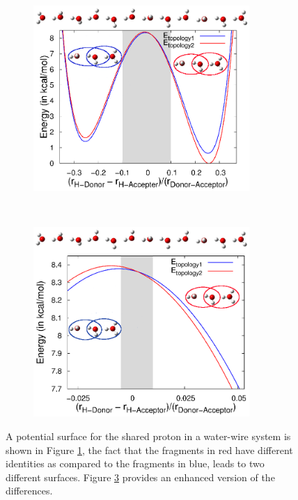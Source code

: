 \begin{figure}[t!]
    \centering
    \begin{subfigure}[t]{0.5\textwidth}
        \centering
        \includegraphics[width=0.9\textwidth]{figures/graph1all.eps}
        \caption{\label{chap1fig2}}
    \end{subfigure}%
    ~
    \begin{subfigure}[t]{0.5\textwidth}
        \centering
        \includegraphics[width=0.9\textwidth]{figures/reZoomedInWithoutCTM.eps}
        \caption{\label{chap1fig3}}
    \end{subfigure}
    \caption{ A potential surface for the shared proton in a water-wire system is
    shown in Figure \ref{chap1fig2}, the fact that the fragments in red have different
    identities as compared to the fragments in blue, leads to two different
    surfaces. Figure \ref{chap1fig3} provides an enhanced version of the differences.}
\end{figure}

